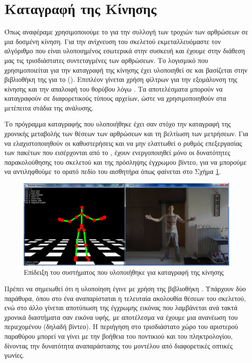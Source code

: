\section{Καταγραφή της Κίνησης}

Όπως αναφέραμε χρησιμοποιούμε το  για την συλλογή των τροχιών των αρθρώσεων σε μια δοσμένη κίνηση. Για την ανίχνευση του σκελετού εκμεταλλευόμαστε τον αλγόριθμο που είναι υλοποιημένος εσωτερικά στην συσκευή και έχουμε στην διάθεση μας τις τρισδιάστατες συντεταγμένες των αρθρώσεων. Το λογισμικό που χρησιμοποιείται για την καταγραφή της κίνησης έχει υλοποιηθεί σε  και βασίζεται στην βιβλιοθήκη της  για το  (). Επιπλέον γίνεται χρήση φίλτρων για την εξομάλυνση της κίνησης και την απαλοιφή του θορύβου λόγω . Τα αποτελέσματα μπορούν να καταγραφούν σε διαφορετικούς τύπους αρχείων, ώστε να χρησιμοποιηθούν στα μετέπειτα στάδια της ανάλυσης.

Το πρόγραμμα καταγραφής που υλοποιήθηκε έχει σαν στόχο την καταγραφή της χρονικής μεταβολής των θέσεων των αρθρώσεων και τη βελτίωση των μετρήσεων. Για να ελαχιστοποιηθούν οι καθυστερήσεις και να μην ελαττωθεί ο ρυθμός επεξεργασίας των πακέτων που εισέρχονται από το , έχουν ενεργοποιηθεί μόνο οι δυνατότητες παρακολούθησης του σκελετού και της πρόσληψης έγχρωμου βίντεο, για να μπορούμε να αντιληφθούμε το ορατό πεδίο του αισθητήρα όπως φαίνεται στο Σχήμα \ref{fig:motion-capture}.

\begin{figure}[H]
    \centering
    \includegraphics[width=.9\textwidth, keepaspectratio]{fig/motion-capture.png}
    \caption{Επίδειξη του συστήματος που υλοποιήθηκε για καταγραφή της κίνησης}
    \label{fig:motion-capture}
\end{figure}

Πρέπει να σημειωθεί ότι η υλοποίηση έγινε με χρήση της βιβλιοθήκη . Υπάρχουν δύο παράθυρα, όπου στο ένα αναπαρίσταται η τελευταία ακολουθία θέσεων του σκελετού, ενώ στο άλλο γίνεται αποτύπωση της έγχρωμης εικόνας που λαμβάνεται ανά τακτά χρονικά διαστήματα σαν εικόνα υφής, με αποτέλεσμα να έχουμε μια ανανέωση του περιεχομένου (δηλαδή βίντεο). Η περιήγηση στο τρισδιάστατο χώρο του αριστερού παραθύρου μπορεί να γίνει με την βοήθεια του ποντικιού και του πληκτρολογίου, δίνοντας την δυνατότητα αναπαράστασης του μοντέλου από διαφορετικές οπτικές γωνίες.

